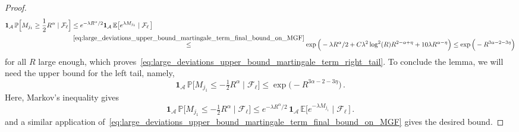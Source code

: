 \documentclass[11pt]{amsart}
\theoremstyle{definition}
\theoremstyle{remark}
\numberwithin{equation}{section}
\def\la{{\lambda}}
\newcommand{\bP}{\mathbb P}
\newcommand{\bE}{\mathbb E}
\begin{document}
\begin{proof}
		\begin{align*}
			\mathbf{1}_{\mathcal{A}} \, \bP\Big[ M_{j_1}  \ge \frac{1}{2} R^{\alpha} \mid \mathcal{F}_\ell\Big] &\le e^{-\la R^\alpha/2} \mathbf{1}_{\mathcal{A}} \, \bE\big[e^{\la M_{j_1}} \mid \mathcal{F}_{\ell} \, \big] \\ & \stackrel{\eqref{eq:large_deviations_upper_bound_martingale_term_final_bound_on_MGF}}{\le} \exp\Big(-\la R^\alpha/2 + C\la^2 \log^2(R) R^{2-\alpha + \eta} +10\la R^{\alpha-\eta} \Big)  \le \exp\Big(-R^{3\alpha -2 -3\eta}\Big)
		\end{align*}
		for all $R$ large enough, which proves~\eqref{eq:large_deviations_upper_bound_martingale_term_right_tail}. To conclude the lemma, we will need the upper bound for the left tail, namely,
		\begin{equation*}
			\mathbf{1}_{\mathcal{A}} \, \bP\Big[ M_{j_1}  \le - \tfrac{1}{2} R^{\alpha} \mid \mathcal{F}_\ell\Big] \le \exp\Big(-R^{3\alpha -2 - 3\eta}\Big) \, .
		\end{equation*}
		Here, Markov's inequality gives 
		\begin{equation*}
			\mathbf{1}_{\mathcal{A}} \, \bP\Big[ M_{j_1}  \le - \tfrac{1}{2} R^{\alpha} \mid \mathcal{F}_\ell\Big] \le e^{-\la R^\alpha /2} \, \mathbf{1}_{\mathcal{A}} \, \bE\big[e^{-\la M_{j_1}} \mid \mathcal{F}_{\ell} \, \big] \, .
		\end{equation*}
		and a similar application of~\eqref{eq:large_deviations_upper_bound_martingale_term_final_bound_on_MGF} gives the desired bound.
	\end{proof}
\end{document}
